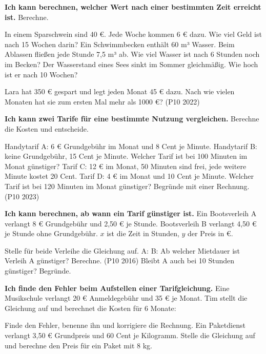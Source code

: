 \begin{aufgabe}{\textbf{Ich kann berechnen, welcher Wert nach einer bestimmten Zeit erreicht ist.} Berechne.}
\begin{teile}
\teil In einem Sparschwein sind 40 €. Jede Woche kommen 6 € dazu. Wie viel Geld ist nach 15 Wochen darin?
\teil Ein Schwimmbecken enthält 60 m³ Wasser. Beim Ablassen fließen jede Stunde 7,5 m³ ab. Wie viel Wasser ist nach 6 Stunden noch im Becken?
\teil Der Wasserstand eines Sees sinkt im Sommer gleichmäßig. Wie hoch ist er nach 10 Wochen? \par
{}
\teil Lara hat 350 € gespart und legt jeden Monat 45 € dazu. Nach wie vielen Monaten hat sie zum ersten Mal mehr als 1000 €? (P10 2022)
\end{teile}
\end{aufgabe}

\begin{aufgabe}{\textbf{Ich kann zwei Tarife für eine bestimmte Nutzung vergleichen.} Berechne die Kosten und entscheide.}
\begin{teile}
\teil Handytarif A: 6 € Grundgebühr im Monat und 8 Cent je Minute. Handytarif B: keine Grundgebühr, 15 Cent je Minute. Welcher Tarif ist bei 100 Minuten im Monat günstiger?
\teil Tarif C: 12 € im Monat, 50 Minuten sind frei, jede weitere Minute kostet 20 Cent. Tarif D: 4 € im Monat und 10 Cent je Minute. Welcher Tarif ist bei 120 Minuten im Monat günstiger? Begründe mit einer Rechnung. (P10 2023)
\end{teile}
\end{aufgabe}

\begin{aufgabe}{\textbf{Ich kann berechnen, ab wann ein Tarif günstiger ist.} Ein Bootsverleih A verlangt 8 € Grundgebühr und 2,50 € je Stunde. Bootsverleih B verlangt 4,50 € je Stunde ohne Grundgebühr. $x$ ist die Zeit in Stunden, $y$ der Preis in €.}
\begin{teile}
\teil Stelle für beide Verleihe die Gleichung auf. \quad A:  \quad B: 
\teil Ab welcher Mietdauer ist Verleih A günstiger? Berechne. (P10 2016)
\teil Bleibt A auch bei 10 Stunden günstiger? Begründe.
\end{teile}
\end{aufgabe}

\begin{aufgabe}{\textbf{Ich finde den Fehler beim Aufstellen einer Tarifgleichung.} Eine Musikschule verlangt 20 € Anmeldegebühr und 35 € je Monat. Tim stellt die Gleichung auf und berechnet die Kosten für 6 Monate:}
\begin{teile}
\teil Finde den Fehler, benenne ihn und korrigiere die Rechnung.
\teil Ein Paketdienst verlangt 3,50 € Grundpreis und 60 Cent je Kilogramm. Stelle die Gleichung auf und berechne den Preis für ein Paket mit 8 kg.
\end{teile}
\end{aufgabe}

